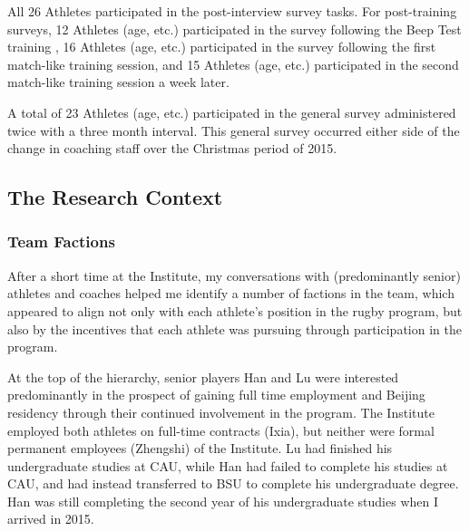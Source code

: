 \begin{CJK}{UTF8}{gbsn}
  All 26 Athletes participated in the post-interview survey tasks.  For post-training surveys, 12 Athletes (age, etc.) participated in the survey following the Beep Test training , 16 Athletes (age, etc.) participated in the survey following the first match-like training session, and 15 Athletes (age, etc.) participated in the second match-like training session a week later.

  A total of 23 Athletes (age, etc.) participated in the general survey administered twice with a three month interval. This general survey occurred either side of the change in coaching staff over the Christmas period of 2015.




\subsection{The Research Context}


\subsubsection{Team Factions}

After a short time at the Institute, my conversations with (predominantly senior) athletes and coaches helped me identify a number of factions in the team, which appeared to align not only with each athlete's position in the rugby program, but also by the incentives that each athlete was pursuing through participation in the program.

At the top of the hierarchy, senior players Han and Lu were interested predominantly in the prospect of gaining full time employment and Beijing residency through their continued involvement in the program. The Institute employed both athletes on full-time contracts (Ixia), but neither were formal permanent employees (Zhengshi) of the Institute.  Lu had finished his undergraduate studies at CAU, while Han had failed to complete his studies at CAU, and had instead transferred to BSU to complete his undergraduate degree. Han was still completing the second year of his undergraduate studies when I arrived in 2015.


\end{CJK}
